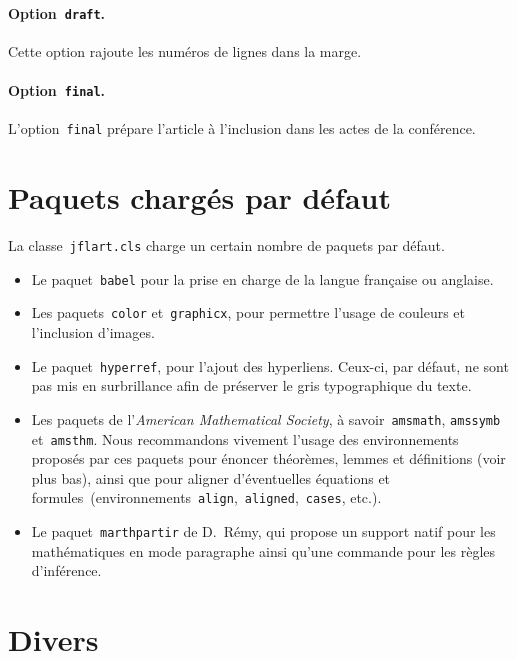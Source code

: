 \documentclass[draft]{jflart}
\begin{document}
\paragraph{Option~\texttt{draft}.}

Cette option rajoute les numéros de lignes dans la marge.

\paragraph{Option~\texttt{final}.}

L'option~\texttt{final} prépare l'article à l'inclusion dans les actes de la
conférence.

\section{Paquets chargés par défaut}

La classe~\texttt{jflart.cls} charge un certain nombre de paquets par défaut.
%
\begin{itemize}
\item
  Le paquet~\texttt{babel} pour la prise en charge de la langue française ou
  anglaise.

\item
  Les paquets~\texttt{color} et~\texttt{graphicx}, pour permettre l'usage de
  couleurs et l'inclusion d'images.

\item
  Le paquet~\texttt{hyperref}, pour l'ajout des hyperliens.
  Ceux-ci, par défaut, ne sont pas mis en surbrillance afin de préserver le gris
  typographique du texte.

\item
  Les paquets de l'\emph{American Mathematical Society}, à
  savoir~\texttt{amsmath}, \texttt{amssymb} et~\texttt{amsthm}.
  Nous recommandons vivement l'usage des environnements proposés par ces paquets
  pour énoncer théorèmes, lemmes et définitions (voir plus bas), ainsi que pour
  aligner d'éventuelles équations et
  formules~(environnements~\texttt{align},~\texttt{aligned},~\texttt{cases},
  etc.).

\item
  Le paquet~\texttt{marthpartir} de D.~Rémy, qui propose un support natif pour
  les mathématiques en mode paragraphe ainsi qu'une commande pour les règles
  d'inférence.

\end{itemize}

\section{Divers}
\end{document}
